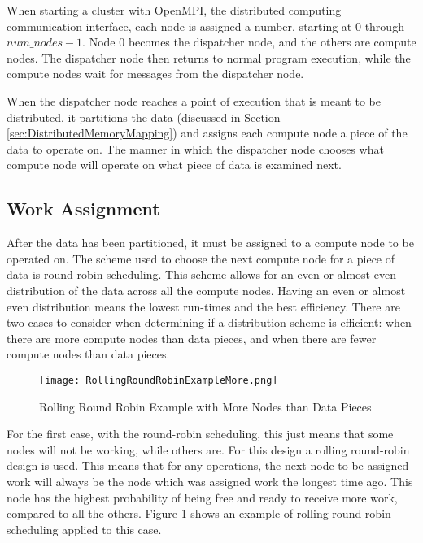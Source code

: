 When starting a cluster with OpenMPI, the distributed computing communication interface, each node is assigned a number, starting at $0$ through $num\_nodes - 1$. Node $0$ becomes the dispatcher node, and the others are compute nodes. The dispatcher node then returns to normal program execution, while the compute nodes wait for messages from the dispatcher node. 

When the dispatcher node reaches a point of execution that is meant to be distributed, it partitions the data (discussed in Section \ref{sec:DistributedMemoryMapping}) and assigns each compute node a piece of the data to operate on. The manner in which the dispatcher node chooses what compute node will operate on what piece of data is examined next.

\subsection{Work Assignment}
After the data has been partitioned, it must be assigned to a compute node to be operated on. The scheme used to choose the next compute node for a piece of data is round-robin scheduling. This scheme allows for an even or almost even distribution of the data across all the compute nodes. Having an even or almost even distribution means the lowest run-times and the best efficiency. There are two cases to consider when determining if a distribution scheme is efficient: when there are more compute nodes than data pieces, and when there are fewer compute nodes than data pieces.

\begin{figure}[htp]
\centering
\texttt{[image: RollingRoundRobinExampleMore.png]}
\caption{Rolling Round Robin Example with More Nodes than Data Pieces}
\label{fig:RollingRoundRobinExampleMore}
\end{figure}
For the first case, with the round-robin scheduling, this just means that some nodes will not be working, while others are. For this design a rolling round-robin design is used. This means that for any operations, the next node to be assigned work will always be the node which was assigned work the longest time ago. This node has the highest probability of being free and ready to receive more work, compared to all the others. Figure \ref{fig:RollingRoundRobinExampleMore} shows an example of rolling round-robin scheduling applied to this case.

